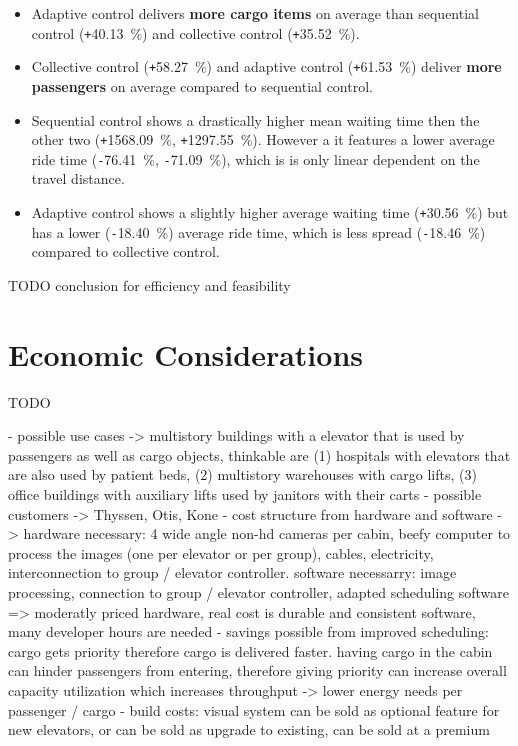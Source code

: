\begin{itemize}
    \item Adaptive control delivers \textbf{more cargo items} on average than sequential control (\texttt{+}40.13~\%) and collective control (\texttt{+}35.52~\%).
    \item Collective control (\texttt{+}58.27~\%) and adaptive control (\texttt{+}61.53~\%) deliver \textbf{more passengers} on average compared to sequential control. 
    \item Sequential control shows a drastically higher mean waiting time then the other two (\texttt{+}1568.09~\%, \texttt{+}1297.55~\%). However a it features a lower average ride time (\texttt{-}76.41~\%, \texttt{-}71.09~\%), which is is only linear dependent on the travel distance.
    \item Adaptive control shows a slightly higher average waiting time (\texttt{+}30.56~\%) but has a lower (\texttt{-}18.40~\%) average ride time, which is less spread (\texttt{-}18.46~\%) compared to collective control.
\end{itemize}

TODO conclusion for efficiency and feasibility



\section{Economic Considerations}
TODO

- possible use cases -> multistory buildings with a elevator that is used by passengers as well as cargo objects, thinkable are (1) hospitals with elevators that are also used by patient beds, (2) multistory warehouses with cargo lifts, (3) office buildings with auxiliary lifts used by janitors with their carts
- possible customers -> Thyssen, Otis, Kone
- cost structure from hardware and software -> hardware necessary: 4 wide angle non-hd cameras per cabin, beefy computer to process the images (one per elevator or per group), cables, electricity, interconnection to group / elevator controller. software necessarry: image processing, connection to group / elevator controller, adapted scheduling software => moderatly priced hardware, real cost is durable and consistent software, many developer hours are needed
- savings possible from improved scheduling: cargo gets priority therefore cargo is delivered faster. having cargo in the cabin can hinder passengers from entering, therefore giving priority can increase overall capacity utilization which increases throughput -> lower energy needs per passenger / cargo
- build costs: visual system can be sold as optional feature for new elevators, or can be sold as upgrade to existing, can be sold at a premium



